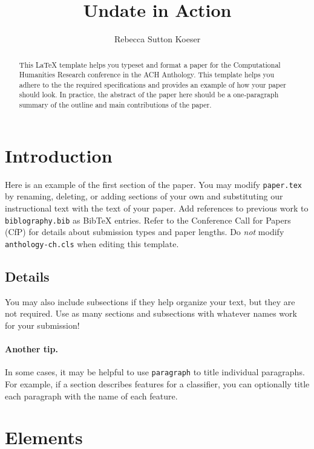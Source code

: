 \documentclass{anthology-ch}         %
\title{Undate in Action}
\author[1]{Rebecca Sutton Koeser}[
  orcid=0000-0002-8762-8057
]
\affiliation{1}{Center for Digital Humanities, Princeton University, Princeton, New Jersey, USA}
\begin{document}
\maketitle

\begin{abstract}
This LaTeX template helps you typeset and format a paper for the Computational Humanities Research conference in the ACH Anthology. This template helps you adhere to the the required specifications and provides an example of how your paper should look. In practice, the abstract of the paper here should be a one-paragraph summary of the outline and main contributions of the paper. 
\end{abstract}

\section{Introduction} 

Here is an example of the first section of the paper. You may modify \texttt{paper.tex} by renaming, deleting, or adding sections of your own and substituting our instructional text with the text of your paper. Add references to previous work to \texttt{biblography.bib} as BibTeX entries. Refer to the Conference Call for Papers (CfP) for details about submission types and paper lengths. Do \textit{not} modify \texttt{anthology-ch.cls} when editing this template. 

\subsection{Details} \label{sec:intro_details}

You may also include subsections if they help organize your text, but they
are not required. Use as many sections and subsections with whatever names work
for your submission!

\paragraph{Another tip.} In some cases, it may be helpful to use \texttt{paragraph} to title individual paragraphs. For example, if a section describes features for a classifier, you can optionally title each paragraph with the name of each feature. 

\section{Elements}
\end{document}
